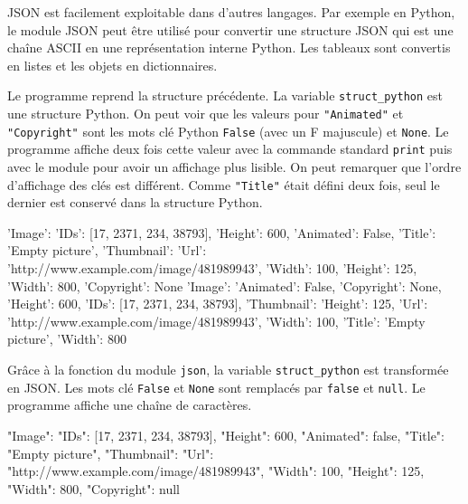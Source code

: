 JSON est facilement exploitable dans d’autres langages. Par exemple en Python, le module JSON peut être utilisé pour convertir une structure JSON qui est une chaîne ASCII en une représentation interne Python. Les tableaux sont convertis en listes et les objets en dictionnaires.

     \vspace{1em}

Le programme  reprend la structure précédente. La variable \texttt{struct\_python} est une structure Python. On peut voir que les valeurs pour \texttt{"Animated"} et \texttt{"Copyright"} sont les mots clé Python \texttt{False} (avec un F majuscule) et \texttt{None}. Le programme affiche deux fois cette valeur avec la commande standard \texttt{print} puis avec le module  pour avoir un affichage plus lisible. On peut remarquer que l'ordre d'affichage des clés est différent. Comme \texttt{"Title"} était défini deux fois, seul le dernier est conservé dans la structure Python.

\begin{termc}[backgroundcolor=\color{palerod}, language=json, basicstyle=\ttfamily\tiny]
{'Image': {'IDs': [17, 2371, 234, 38793], 'Height': 600, 'Animated': False, 'Title': 'Empty picture', 'Thumbnail': 
{'Url': 'http://www.example.com/image/481989943', 'Width': 100, 'Height': 125}, 'Width': 800, 'Copyright': None}}
{'Image': {'Animated': False,
           'Copyright': None,
           'Height': 600,
           'IDs': [17, 2371, 234, 38793],
           'Thumbnail': {'Height': 125,
                         'Url': 'http://www.example.com/image/481989943',
                         'Width': 100},
           'Title': 'Empty picture',
           'Width': 800}}
\end{termc}

Grâce à la fonction  du module \texttt{json}, la variable \texttt{struct\_python} est transformée en JSON. Les mots clé  \texttt{False} et  \texttt{None} sont remplacés par  \texttt{false} et  \texttt{null}. Le programme affiche une chaîne de caractères.

\begin{termc}[backgroundcolor=\color{palerod}, language=json, basicstyle=\ttfamily\tiny]
{"Image": {"IDs": [17, 2371, 234, 38793], "Height": 600, "Animated": false, "Title": "Empty picture", "Thumbnail": 
{"Url": "http://www.example.com/image/481989943", "Width": 100, "Height": 125}, "Width": 800, "Copyright": null}}
\end{termc}

